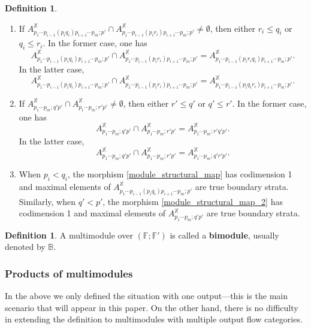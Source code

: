 \documentclass[reqno, 10pt]{amsart}
\numberwithin{equation}{section}
\numberwithin{equation}{section}
\theoremstyle{definition}
\newtheorem{defn}[thm]{Definition}
\theoremstyle{remark}
\newcommand{\beqn}{\begin{equation*}}
\newcommand{\eeqn}{\end{equation*}}
\newcommand{\mb}{\mathbb}
\begin{document}
\begin{defn}
\begin{enumerate}
\item If $A_{p_1 \cdots p_{i-1} (p_i q_i) p_{i+1} \cdots p_m; p'}^{\mb X} \cap A_{p_1 \cdots p_{i-1}(p_i r_i) p_{i+1} \cdots p_m; p'}^{\mb X} \neq \emptyset$, then either $r_i \leq q_i$ or $q_i \leq r_i$. In the former case, one has 
\beqn
A_{p_1 \cdots p_{i-1} (p_i q_i) p_{i+1} \cdots p_m; p'}^{\mb X} \cap A_{p_1 \cdots p_{i-1}(p_i r_i) p_{i+1} \cdots p_m; p'}^{\mb X} = A_{p_1 \cdots p_{i-1}(p_i r_i q_i) p_{i+1} \cdots p_m; p'}^{{\mb X}}.
\eeqn
In the latter case, 
\beqn
A_{p_1 \cdots p_{i-1} (p_i q_i) p_{i+1} \cdots p_m; p'}^{\mb X} \cap A_{p_1 \cdots p_{i-1}(p_i r_i) p_{i+1} \cdots p_m; p'}^{\mb X} = A_{p_1 \cdots p_{i-1}(p_i q_i r_i) p_{i+1} \cdots p_m; p'}^{{\mb X}}.
\eeqn
\item If $A_{p_1\cdots p_m; q'p'}^{\mb X} \cap A_{p_1 \cdots p_m; r'p'}^{\mb X} \neq \emptyset$, then either $r' \leq q'$ or $q' \leq r'$. In the former case, one has 
\beqn
A_{p_1\cdots p_m; q'p'}^{\mb X} \cap A_{p_1 \cdots p_m; r'p'}^{\mb X} = A_{p_1\cdots p_m; r'q'p'}^{\mb X}.
\eeqn
In the latter case, 
\beqn
A_{p_1\cdots p_m; q'p'}^{\mb X} \cap A_{p_1 \cdots p_m; r'p'}^{\mb X} = A_{p_1 \cdots p_m; q'r'p'}^{\mb X}.
\eeqn


\item When $p_i < q_i$, the morphism \eqref{module_structural_map} has codimension 1 and maximal elements of $A_{p_1 \cdots p_{i-1} (p_i q_i) p_{i+1} \cdots p_m; p'}^{\mb X}$ are true boundary strata. Similarly, when $q' < p'$, the morphism \eqref{module_structural_map_2} has codimension 1 and maximal elements of $A_{p_1 \cdots p_m; q'p'}^{\mb X}$ are true boundary strata.

\end{enumerate}
\end{defn}


\begin{defn}
A multimodule over $({\mb F}; {\mb F}')$ is called a {\bf bimodule}, usually denoted by ${\mb B}$.
\end{defn}





\subsubsection{Products of multimodules}

In the above we only defined the situation with one output---this is the main scenario that will appear in this paper. On the other hand, there is no difficulty in extending the definition to multimodules with multiple output flow categories.
\end{document}
